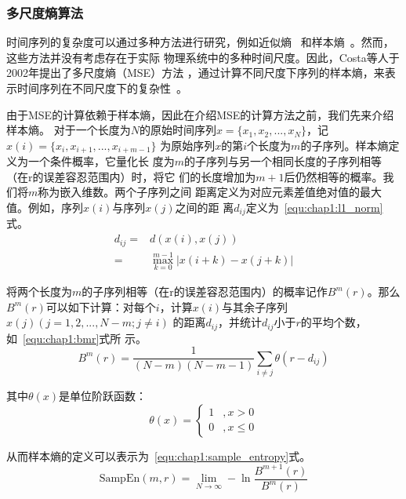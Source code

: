 \subsubsection{多尺度熵算法}

时间序列的复杂度可以通过多种方法进行研究，例如近似熵~\cite{valenza2014inhomogeneous}
和样本熵~\cite{yentes2013appropriate}。然而，这些方法并没有考虑存在于实际
物理系统中的多种时间尺度。因此，Costa等人于2002年提出了多尺度熵（MSE）方法
，通过计算不同尺度下序列的样本熵，来表示时间序列在不同尺度下的复杂性~\cite{costa2002multiscale}。

由于MSE的计算依赖于样本熵，因此在介绍MSE的计算方法之前，我们先来介绍样本熵。
对于一个长度为$N$的原始时间序列$x=\{x_1, x_2, ..., x_N\}$，记$x(i)=\{x_i, x_{i+1}, ..., x_{i+m-1}\}$
为原始序列$x$的第$i$个长度为$m$的子序列。样本熵定义为一个条件概率，它量化长
度为$m$的子序列与另一个相同长度的子序列相等（在r的误差容忍范围内）时，将它
们的长度增加为$m+1$后仍然相等的概率。我们将$m$称为嵌入维数。两个子序列之间
距离定义为对应元素差值绝对值的最大值。例如，序列$x(i)$与序列$x(j)$之间的距
离$d_{ij}$定义为~\ref{equ:chap1:l1_norm}式。
\begin{equation}
  \label{equ:chap1:l1_norm}
  \begin{aligned}
    d_{ij} = & d(x(i), x(j)) \\
    = & \max_{k=0}^{m-1}|x(i+k)-x(j+k)|
  \end{aligned}
\end{equation}

将两个长度为$m$的子序列相等（在r的误差容忍范围内）的概率记作$B^m(r)$。那么
$B^m(r)$可以如下计算：对每个$i$，计算$x(i)$与其余子序列$x(j)(j=1,2,...,N-m; j\neq i)$
的距离$d_{ij}$，并统计$d_{ij}$小于$r$的平均个数，如~\ref{equ:chap1:bmr}式所
示。
\begin{equation}
  \label{equ:chap1:bmr}
  B^m(r)=\frac{1}{(N-m)(N-m-1)}\sum_{i\neq j}\theta(r-d_{ij})
\end{equation}

其中$\theta(x)$是单位阶跃函数：
\begin{equation}
  \label{equ:chap1:step_func}
  \theta(x) = \left\{
  \begin{aligned}
    1 &, x > 0 \\
    0 &, x \leq 0
  \end{aligned}
  \right.
\end{equation}

从而样本熵的定义可以表示为~\ref{equ:chap1:sample_entropy}式。
\begin{equation}
  \label{equ:chap1:sample_entropy}
  \text{SampEn}(m, r) = \lim_{N\to\infty}-\ln\frac{B^{m+1}(r)}{B^m(r)}
\end{equation}

